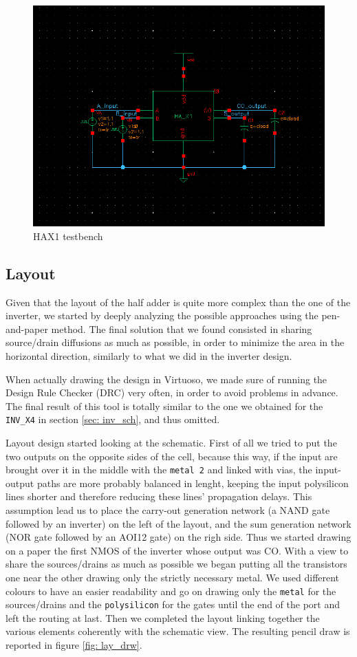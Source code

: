 \documentclass[a4paper]{article}
\newcommand{\inv}{\texttt{INV\_X4}\xspace}
\begin{document}
\begin{figure}[H]
      \centering
       \includegraphics[width=12cm]{./Images/HA/HAX1_TB_schematic.png}
\caption{HAX1 testbench}
\label{fig: HAX1_tb}
\end{figure}

\subsection{Layout}
Given that the layout of the half adder is quite more complex than the one of the inverter, we started by deeply analyzing the possible approaches using the pen-and-paper method. The final solution that we found consisted in sharing source/drain diffusions as much as possible, in order to minimize the area in the horizontal direction, similarly to what we did in the inverter design.

When actually drawing the design in Virtuoso, we made sure of running the Design Rule Checker (DRC) very often, in order to avoid problems in advance. The final result of this tool is totally similar to the one we obtained for the \inv in section \ref{sec: inv_sch}, and thus omitted.

Layout design started looking at the schematic. First of all we tried to put the two outputs on the opposite sides of the cell, because this way, if the input are brought over it in the middle with the \texttt{metal 2} and linked with vias, the input-output paths are more probably balanced in lenght, keeping the input polysilicon lines shorter and therefore reducing these lines' propagation delays. This assumption lead us to place the carry-out generation network (a NAND gate followed by an inverter) on the left of the layout, and the sum generation network (NOR gate followed by an AOI12 gate) on the righ side.
Thus we started drawing on a paper the first NMOS of the inverter whose output was CO. With a view to share the sources/drains as much as possible we began putting all the transistors one near the other drawing only the strictly necessary metal.
We used different colours to have an easier readability and go on drawing only the \texttt{metal} for the sources/drains and the \texttt{polysilicon} for the gates until the end of the port and left the routing at last. Then we completed the layout linking together the various elements coherently with the schematic view. The resulting pencil draw is reported in figure \ref{fig: lay_drw}.
\end{document}
